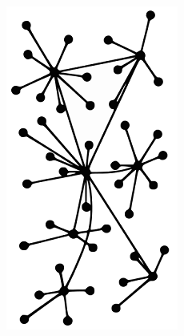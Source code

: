 \documentclass[notitlepage, usenames,dvipsnames]{beamer}
\begin{document}
\begin{frame}
{\begin{columns}
                \includegraphics[scale=0.3]{../img/decentralization.png}
            \end{columns}
        }

    \end{frame}
\end{document}
